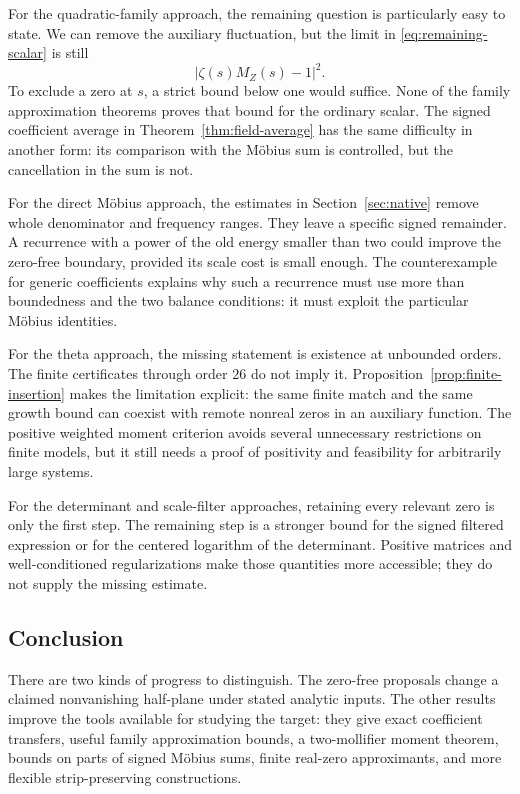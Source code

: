 For the quadratic-family approach, the remaining question is particularly easy to state. We can remove the auxiliary fluctuation, but the limit in \eqref{eq:remaining-scalar} is still
\[
 |\zeta(s)M_Z(s)-1|^2.
\]
To exclude a zero at $s$, a strict bound below one would suffice. None of the family approximation theorems proves that bound for the ordinary scalar. The signed coefficient average in Theorem~\ref{thm:field-average} has the same difficulty in another form: its comparison with the M\"obius sum is controlled, but the cancellation in the sum is not.

For the direct M\"obius approach, the estimates in Section~\ref{sec:native} remove whole denominator and frequency ranges. They leave a specific signed remainder. A recurrence with a power of the old energy smaller than two could improve the zero-free boundary, provided its scale cost is small enough. The counterexample for generic coefficients explains why such a recurrence must use more than boundedness and the two balance conditions: it must exploit the particular M\"obius identities.

For the theta approach, the missing statement is existence at unbounded orders. The finite certificates through order $26$ do not imply it. Proposition~\ref{prop:finite-insertion} makes the limitation explicit: the same finite match and the same growth bound can coexist with remote nonreal zeros in an auxiliary function. The positive weighted moment criterion avoids several unnecessary restrictions on finite models, but it still needs a proof of positivity and feasibility for arbitrarily large systems.

For the determinant and scale-filter approaches, retaining every relevant zero is only the first step. The remaining step is a stronger bound for the signed filtered expression or for the centered logarithm of the determinant. Positive matrices and well-conditioned regularizations make those quantities more accessible; they do not supply the missing estimate.

\subsection{Conclusion}
There are two kinds of progress to distinguish. The zero-free proposals change a claimed nonvanishing half-plane under stated analytic inputs. The other results improve the tools available for studying the target: they give exact coefficient transfers, useful family approximation bounds, a two-mollifier moment theorem, bounds on parts of signed M\"obius sums, finite real-zero approximants, and more flexible strip-preserving constructions.


